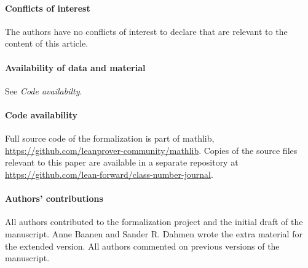 \documentclass[sn-mathphys]{sn-jnl}%
\newcommand{\mathlib}{\textsf{mathlib}\xspace}
\begin{document}
\paragraph{Conflicts of interest}
The authors have no conflicts of interest to declare that are relevant to the content of this article.

\paragraph{Availability of data and material}
See \emph{Code availabilty}.

\paragraph{Code availability}
Full source code of the formalization is part of \mathlib, \url{https://github.com/leanprover-community/mathlib}. Copies of the source files relevant to this paper are available in a separate repository at \url{https://github.com/lean-forward/class-number-journal}.

\paragraph{Authors' contributions}
All authors contributed to the formalization project and the initial draft of the manuscript.  Anne Baanen and Sander R. Dahmen wrote the extra material for the extended version. All authors commented on previous versions of the manuscript.


\end{document}
